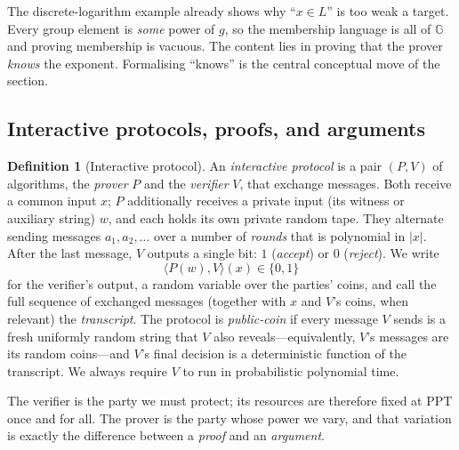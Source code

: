 \documentclass[11pt,a4paper]{article}
\theoremstyle{definition}
\newtheorem{definition}[theorem]{Definition}
\theoremstyle{remark}
\newcommand{\G}{\ensuremath{\mathbb{G}}}
\begin{document}
The discrete-logarithm example already shows why ``\(x\in L\)'' is too weak a target. Every group element is \emph{some} power of \(g\), so the membership language is all of \(\G\) and proving membership is vacuous. The content lies in proving that the prover \emph{knows} the exponent. Formalising ``knows'' is the central conceptual move of the section.

\subsection{Interactive protocols, proofs, and arguments}\label{zk:subsec:protocols}

\begin{definition}[Interactive protocol]\label{zk:def:interactive}
An \emph{interactive protocol} is a pair \((P, V)\) of algorithms, the \emph{prover} \(P\) and the \emph{verifier} \(V\), that exchange messages. Both receive a common input \(x\); \(P\) additionally receives a private input (its witness or auxiliary string) \(w\), and each holds its own private random tape. They alternate sending messages \(a_1, a_2, \dots\) over a number of \emph{rounds} that is polynomial in \(|x|\). After the last message, \(V\) outputs a single bit: \(1\) (\emph{accept}) or \(0\) (\emph{reject}). We write
\[
  \langle P(w), V \rangle(x) \in \{0,1\}
\]
for the verifier's output, a random variable over the parties' coins, and call the full sequence of exchanged messages (together with \(x\) and \(V\)'s coins, when relevant) the \emph{transcript}. The protocol is \emph{public-coin} if every message \(V\) sends is a fresh uniformly random string that \(V\) also reveals---equivalently, \(V\)'s messages are its random coins---and \(V\)'s final decision is a deterministic function of the transcript. We always require \(V\) to run in probabilistic polynomial time.
\end{definition}

The verifier is the party we must protect; its resources are therefore fixed at PPT once and for all. The prover is the party whose power we vary, and that variation is exactly the difference between a \emph{proof} and an \emph{argument}.
\end{document}
